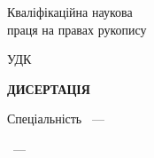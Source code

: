 \thispagestyle{empty}%
\begin{center}%
\thesisOrganization

\thesisMON

\thesisOrganization

\thesisMON

\end{center}%

\vspace{0pt plus4fill} %
\begin{flushright}%
  \begin{minipage}[b]{0.4\linewidth}
    \begin{flushleft}%
Кваліфікаційна наукова \\
праця на правах рукопису
    \end{flushleft}%
  \end{minipage}
\end{flushright}%

\vspace{0pt plus3fill} %
\begin{center}%
{\textbf{\MakeUppercase{\thesisAuthor}} }
\end{center}%

\vspace{0pt plus1fill} %
\begin{flushright}%
  \begin{minipage}[b]{0.45\linewidth}
    \begin{flushleft}%
       УДК \thesisUdk
    \end{flushleft}%
  \end{minipage}
\end{flushright}%

\vspace{0pt plus1fill} %
\begin{center}%
{\textbf{ДИСЕРТАЦІЯ} }
\end{center}%
%

\vspace{0pt plus1fill} %
\begin{center}%
\MakeUppercase{
\thesisTitle}

\vspace{0pt plus4fill} %
{%
Спеціальність \thesisSpecialtyNumber~---~
\thesisSpecialtyTitle

\thesisKnowledgeNumber~---~\thesisKnowledgeTitle
}
\end{center}%

